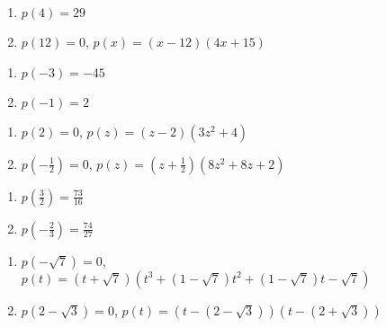 \documentclass{ximera}
\begin{document}
\begin{multicols}{2}
\begin{enumerate}
\setcounter{enumi}{\value{HW}}

\item $p(4) = 29$
\item $p(12) =0$, $p(x) = (x-12)(4x+15)$

\setcounter{HW}{\value{enumi}}
\end{enumerate}
\end{multicols}


\begin{multicols}{2}
\begin{enumerate}
\setcounter{enumi}{\value{HW}}

\item $p(-3)=-45$
\item $p(-1)=2$

\setcounter{HW}{\value{enumi}}
\end{enumerate}
\end{multicols}

\begin{multicols}{2}
\begin{enumerate}
\setcounter{enumi}{\value{HW}}

\item $p(2) =0$, $p(z)= (z-2) \left(3z^2+4\right)$
\item $p\left(-\frac{1}{2}\right) = 0$, $p(z)  = \left(z+\frac{1}{2}\right)\left(8z^2+8z+2\right)$

\setcounter{HW}{\value{enumi}}
\end{enumerate}
\end{multicols}

\begin{multicols}{2}
\begin{enumerate}
\setcounter{enumi}{\value{HW}}

\item $p\left(\frac{3}{2}\right) = \frac{73}{16}$
\item $p\left(-\frac{2}{3}\right) = \frac{74}{27}$

\setcounter{HW}{\value{enumi}}
\end{enumerate}
\end{multicols}

\begin{enumerate}
\setcounter{enumi}{\value{HW}}

\item $p(-\sqrt{7}) = 0$, $p(t) = (t+\sqrt{7})\left(t^3+(1-\sqrt{7}) t^2+(1-\sqrt{7})t-\sqrt{7}  \right)$
\item $p(2-\sqrt{3}) =0$, $p(t) = (t-(2-\sqrt{3}))(t-(2+\sqrt{3})) $

\setcounter{HW}{\value{enumi}}
\end{enumerate}
\end{document}
